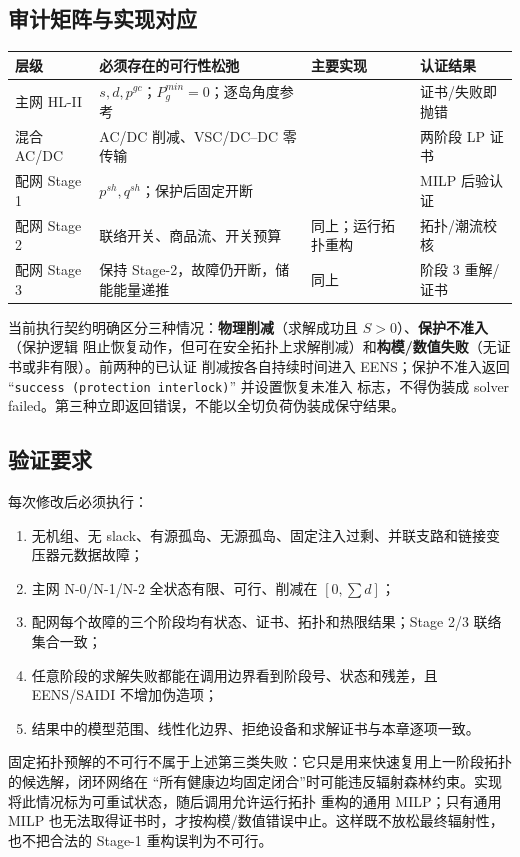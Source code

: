 \subsection{审计矩阵与实现对应}
\begin{center}\footnotesize
\begin{tabular}{@{}L{3.5cm}L{4.2cm}L{4.8cm}L{2.3cm}@{}}
\toprule
层级 & 必须存在的可行性松弛 & 主要实现 & 认证结果\\
\midrule
主网 HL-II & $s,d,p^{gc}$；$P_g^{min}=0$；逐岛角度参考 &  & 证书/失败即抛错\\
混合 AC/DC & AC/DC 削减、VSC/DC--DC 零传输 &  & 两阶段 LP 证书\\
配网 Stage 1 & $p^{sh},q^{sh}$；保护后固定开断 &  & MILP 后验认证\\
配网 Stage 2 & 联络开关、商品流、开关预算 & 同上；运行拓扑重构 & 拓扑/潮流校核\\
配网 Stage 3 & 保持 Stage-2，故障仍开断，储能能量递推 & 同上 & 阶段 3 重解/证书\\
\bottomrule
\end{tabular}
\end{center}

当前执行契约明确区分三种情况：\textbf{物理削减}（求解成功且 $S>0$）、\textbf{保护不准入}（保护逻辑
阻止恢复动作，但可在安全拓扑上求解削减）和\textbf{构模/数值失败}（无证书或非有限）。前两种的已认证
削减按各自持续时间进入 EENS；保护不准入返回 ``\texttt{success (protection interlock)}'' 并设置恢复未准入
标志，不得伪装成 solver failed。第三种立即返回错误，不能以全切负荷伪装成保守结果。

\subsection{验证要求}
每次修改后必须执行：
\begin{enumerate}
  \item 无机组、无 slack、有源孤岛、无源孤岛、固定注入过剩、并联支路和链接变压器元数据故障；
  \item 主网 N-0/N-1/N-2 全状态有限、可行、削减在 $[0,\sum d]$；
  \item 配网每个故障的三个阶段均有状态、证书、拓扑和热限结果；Stage 2/3 联络集合一致；
  \item 任意阶段的求解失败都能在调用边界看到阶段号、状态和残差，且 EENS/SAIDI 不增加伪造项；
  \item 结果中的模型范围、线性化边界、拒绝设备和求解证书与本章逐项一致。
\end{enumerate}

固定拓扑预解的不可行不属于上述第三类失败：它只是用来快速复用上一阶段拓扑的候选解，闭环网络在
“所有健康边均固定闭合”时可能违反辐射森林约束。实现将此情况标为可重试状态，随后调用允许运行拓扑
重构的通用 MILP；只有通用 MILP 也无法取得证书时，才按构模/数值错误中止。这样既不放松最终辐射性，
也不把合法的 Stage-1 重构误判为不可行。
